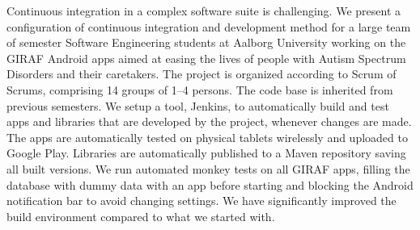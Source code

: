 Continuous integration in a complex software suite is challenging. We present a configuration of continuous integration and development method for a large team of  semester Software Engineering students at Aalborg University working on the GIRAF Android apps aimed at easing the lives of people with Autism Spectrum Disorders and their caretakers. The project is organized according to Scrum of Scrums, comprising 14 groups of 1--4 persons. The code base is inherited from previous semesters. We setup a tool, Jenkins, to automatically build and test apps and libraries that are developed by the project, whenever changes are made. The apps are automatically tested on physical tablets wirelessly and uploaded to Google Play. Libraries are automatically published to a Maven repository saving all built versions. We run automated monkey tests on all GIRAF apps, filling the database with dummy data with an app before starting and blocking the Android notification bar to avoid changing settings. We have significantly improved the build environment compared to what we started with.